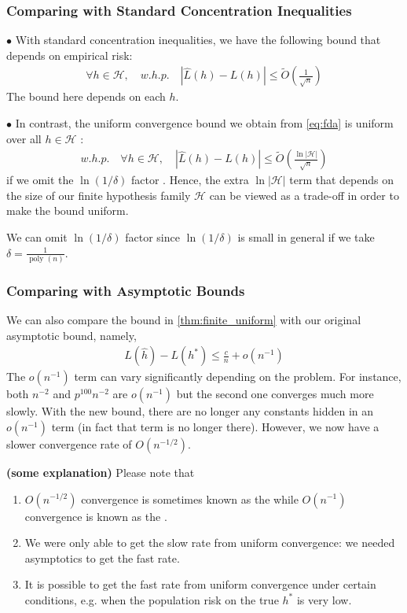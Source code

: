 \documentclass{article}
\newcommand{\bfs}[1]{\textbf{({#1}) }}
\begin{document}
\subsubsection{Comparing with Standard Concentration Inequalities}
$\bullet$  With standard concentration inequalities, we have the following bound that depends on empirical risk:
\begin{align*}
\forall h \in \mathcal{H}, \quad w.h.p . \quad|\hat{L}(h)-L(h)| \leq \tilde{O}\left(\frac{1}{\sqrt{n}}\right)
\end{align*}
The bound here depends on each $h$.

$\bullet$ In contrast, the uniform convergence bound we obtain from \cref{eq:fda} is uniform over all $h \in \mathcal{H}$ :
\begin{align*}
w.h.p. \quad \forall h \in \mathcal{H}, \quad|\hat{L}(h)-L(h)| \leq \tilde{O}\left(\frac{\ln |\mathcal{H}|}{\sqrt{n}}\right)
\end{align*}
if we omit the $\ln (1 / \delta)$ factor . Hence, the extra $\ln |\mathcal{H}|$ term that depends on the size of our finite hypothesis family $\mathcal{H}$ can be viewed as a trade-off in order to make the bound uniform.

\begin{rema}
We can omit $\ln (1 / \delta)$ factor since $\ln (1 / \delta)$ is small in general if we take $\delta=\frac{1}{\text { poly }(n)}$.
\end{rema}

\subsubsection{Comparing   with Asymptotic Bounds}
We can also compare the bound in \cref{thm:finite_uniform} with our original asymptotic bound, namely,
\begin{align*}
L(\hat{h})-L\left(h^{*}\right) \leq \frac{c}{n}+o\left(n^{-1}\right)
\end{align*}
The $o\left(n^{-1}\right)$ term can vary significantly depending on the problem. For instance, both $n^{-2}$ and $p^{100} n^{-2}$ are $o\left(n^{-1}\right)$ but the second one converges much more slowly. With the new bound, there are no longer any constants hidden in an $o\left(n^{-1}\right)$ term (in fact that term is no longer there). However, we now have a slower convergence rate of $O\left(n^{-1 / 2}\right)$.
\begin{rema}\bfs{some explanation} Please note that 
\begin{enumerate}
    \item $O\left(n^{-1 / 2}\right)$ convergence is sometimes known as the  while $O\left(n^{-1}\right)$ convergence is known as the .
    \item We were only able to get the slow rate from uniform convergence: we needed asymptotics to get the fast rate.
    \item It is possible to get the fast rate from uniform convergence under certain conditions, e.g. when the population risk on the true $h^{*}$ is very low.
\end{enumerate}
\end{rema}
\end{document}
